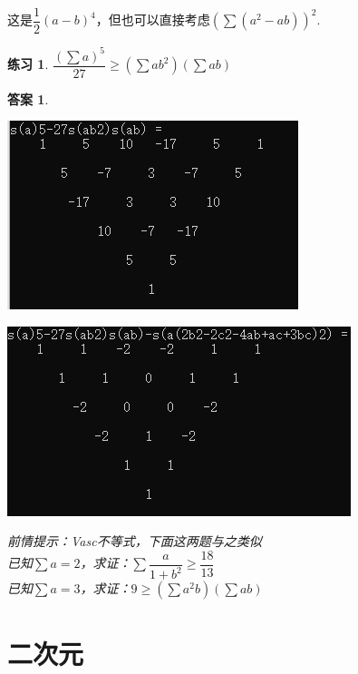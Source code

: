 \documentclass[UTF8]{ctexart}
\newtheorem{3}{练习}
\newtheorem{4}{答案}
\begin{document}
这是$ \dfrac{1}{2}(a-b)^{4} $，但也可以直接考虑$ (\displaystyle \sum (a^{2}-ab))^{2} $.
\begin{3}
	$ \dfrac{(\displaystyle \sum a)^{5}}{27} \geq (\displaystyle \sum ab^{2})(\displaystyle \sum ab)$
\end{3}
\begin{4}
	\begin{center}
		\includegraphics[width=0.5\linewidth]{0340}
	\end{center}
	\begin{center}
		\includegraphics[width=0.5\linewidth]{0350}
	\end{center}
	前情提示：Vasc不等式，下面这两题与之类似\\
	已知$ \displaystyle \sum a=2 $，求证：$\displaystyle \sum  \dfrac{a}{1+b^{2}}\geq \dfrac{18}{13} $\\
	已知$ \displaystyle \sum a=3 $，求证：$ 9\geq (\displaystyle \sum a^{2}b)(\displaystyle \sum ab) $
\end{4}
\section{二次元}
\end{document}
